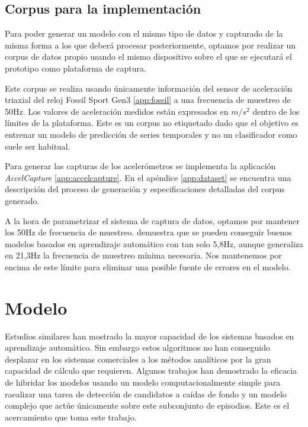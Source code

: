 \documentclass[../tfm.tex]{subfiles}
\begin{document}
\subsection{Corpus para la implementación}

Para poder generar un modelo con el mismo tipo de datos y capturado de la misma forma a los que deberá procesar posteriormente, optamos por realizar un corpus de datos propio usando el mismo dispositivo sobre el que se ejecutará el prototipo como plataforma de captura.

Este corpus se realiza usando únicamente información del sensor de aceleración triaxial del reloj Fossil Sport Gen3 \ref{app:fossil} a una frecuencia de muestreo de 50Hz. Los valores de aceleración medidos están expresados en $m/s^2$ dentro de los límites de la plataforma. Este es un corpus no etiquetado dado que el objetivo es entrenar un modelo de predicción de series temporales y no un clasificador como suele ser habitual.

Para generar las capturas de los acelerómetros se implementa la aplicación \textit{AccelCapture} \ref{app:accelcapture}. En el apéndice \ref{app:dataset} se encuentra una descripción del proceso de generación y especificaciones detalladas del corpus generado.

A la hora de parametrizar el sistema de captura de datos, optamos por mantener los 50Hz de frecuencia de muestreo. \cite{Liu2018} demuestra que se pueden conseguir buenos modelos basados en aprendizaje automático con tan solo 5,8Hz, aunque generaliza en 21,3Hz la frecuencia de muestreo mínima necesaria. Nos mantenemos por encima de este límite para eliminar una posible fuente de errores en el modelo.

\section{Modelo}\label{req_modelos}

Estudios similares han mostrado la mayor capacidad de los sistemas basados en aprendizaje automático. Sin embargo estos algoritmos no han conseguido desplazar en los sistemas comerciales a los métodos analíticos por la gran capacidad de cálculo que requieren. Algunos trabajos han demostrado la eficacia de hibridar los modelos usando un modelo computacionalmente simple para raealizar una tarea de detección de candidatos a caídas de fondo y un modelo complejo que actúe únicamente sobre este subconjunto de episodios. Este es el acercamiento que toma este trabajo.
\end{document}
